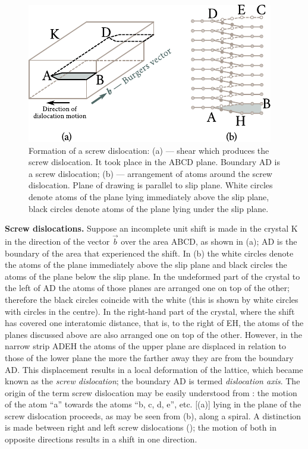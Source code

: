 \begin{figure}[t]
	\begin{center}
		\includegraphics[scale=1.1]{figures/ch_02/fig_2_11.pdf}
		\caption[]{Formation of a screw dislocation: (a) --- shear which produces the screw dislocation. It took place in the ABCD plane. Boundary AD is a screw dislocation; (b) --- arrangement of atoms around the screw dislocation. Plane of drawing is parallel to slip plane. White circles denote atoms of the plane lying immediately above the slip plane, black circles denote atoms of the plane lying under the slip plane.}
		\label{fig:2_11}
	\end{center}
	\vspace{-0.7cm}
\end{figure}

\textbf{Screw dislocations.} Suppose an incomplete unit shift is made in the crystal K in the direction of the vector $\vec{b}$ over the area ABCD, as shown in (a); AD is the boundary of the area that experienced the shift. In (b) the white circles denote the atoms of the plane immediately above the slip plane and black circles the atoms of the plane below the slip plane. In the undeformed part of the crystal to the left of AD the atoms of those planes are arranged one on top of the other; therefore the black circles coincide with the white (this is shown by white circles with circles in the centre). In the right-hand part of the crystal, where the shift has covered one interatomic distance, that is, to the right of EH, the atoms of the planes discussed above are also arranged one on top of the other. However, in the narrow strip ADEH the atoms of the upper plane are displaced in relation to those of the lower plane the more the farther away they are from the boundary AD. This displacement results in a local deformation of the lattice, which became known as the \textit{screw dislocation}; the boundary AD is termed \textit{dislocation axis}. The origin of the term screw dislocation may be easily understood from : the motion of the atom ``a'' towards the atoms ``b, c, d, e'', etc. [(a)] lying in the plane of the screw dislocation proceeds, as may be seen from (b), along a spiral. A distinction is made between right and left screw dislocations (); the motion of both in opposite directions results in a shift in one direction.

